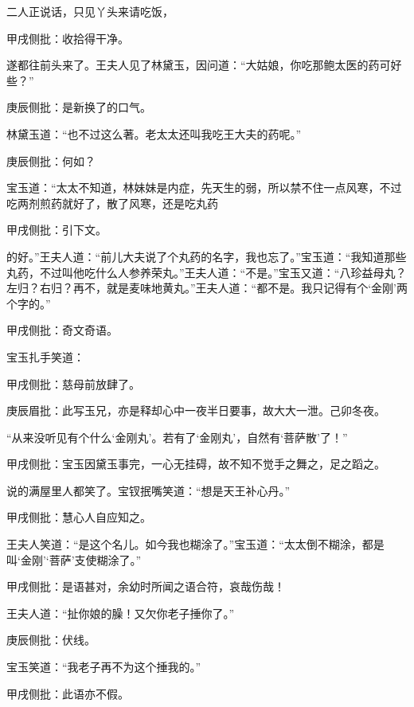 \begin{parag}
    二人正说话，只见丫头来请吃饭，\begin{note}甲戌侧批：收拾得干净。\end{note}遂都往前头来了。王夫人见了林黛玉，因问道：“大姑娘，你吃那鲍太医的药可好些？”\begin{note}庚辰侧批：是新换了的口气。\end{note}林黛玉道：“也不过这么著。老太太还叫我吃王大夫的药呢。”\begin{note}庚辰侧批：何如？\end{note}宝玉道：“太太不知道，林妹妹是内症，先天生的弱，所以禁不住一点风寒，不过吃两剂煎药就好了，散了风寒，还是吃丸药\begin{note}甲戌侧批：引下文。\end{note}的好。”王夫人道：“前儿大夫说了个丸药的名字，我也忘了。”宝玉道：“我知道那些丸药，不过叫他吃什么人参养荣丸。”王夫人道：“不是。”宝玉又道：“八珍益母丸？左归？右归？再不，就是麦味地黄丸。”王夫人道：“都不是。我只记得有个‘金刚’两个字的。”\begin{note}甲戌侧批：奇文奇语。\end{note}宝玉扎手笑道：\begin{note}甲戌侧批：慈母前放肆了。\end{note}\begin{note}庚辰眉批：此写玉兄，亦是释却心中一夜半日要事，故大大一泄。己卯冬夜。\end{note}“从来没听见有个什么‘金刚丸’。若有了‘金刚丸’，自然有‘菩萨散’了！”\begin{note}甲戌侧批：宝玉因黛玉事完，一心无挂碍，故不知不觉手之舞之，足之蹈之。\end{note}说的满屋里人都笑了。宝钗抿嘴笑道：“想是天王补心丹。”\begin{note}甲戌侧批：慧心人自应知之。\end{note}王夫人笑道：“是这个名儿。如今我也糊涂了。”宝玉道：“太太倒不糊涂，都是叫‘金刚’‘菩萨’支使糊涂了。”\begin{note}甲戌侧批：是语甚对，余幼时所闻之语合符，哀哉伤哉！\end{note}王夫人道：“扯你娘的臊！又欠你老子捶你了。”\begin{note}庚辰侧批：伏线。\end{note}宝玉笑道：“我老子再不为这个捶我的。”\begin{note}甲戌侧批：此语亦不假。\end{note}
\end{parag}


